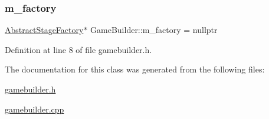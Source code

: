 \subsubsection{\texorpdfstring{m\+\_\+factory}{m\_factory}}
{\footnotesize\ttfamily \mbox{\hyperlink{class_abstract_stage_factory}{Abstract\+Stage\+Factory}}$\ast$ Game\+Builder\+::m\+\_\+factory = nullptr\hspace{0.3cm}{\ttfamily [protected]}}



Definition at line 8 of file gamebuilder.\+h.



The documentation for this class was generated from the following files\+:\begin{DoxyCompactItemize}
\item 
\mbox{\hyperlink{gamebuilder_8h}{gamebuilder.\+h}}\item 
\mbox{\hyperlink{gamebuilder_8cpp}{gamebuilder.\+cpp}}\end{DoxyCompactItemize}
